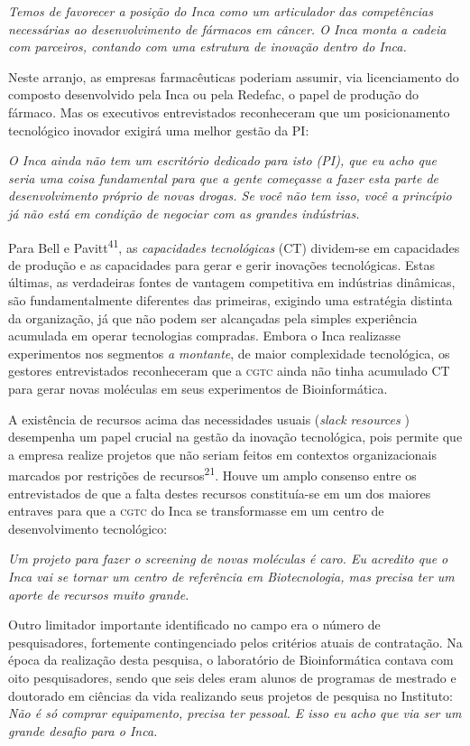 \documentclass{article}
\begin{document}
\textit{Temos de favorecer a posição do Inca como um articulador das
competências necessárias ao desenvolvimento de fármacos em câncer. O Inca monta
a cadeia com parceiros, contando com uma estrutura de inovação dentro do Inca.}

Neste arranjo, as empresas farmacêuticas poderiam assumir, via licenciamento do
composto desenvolvido pela Inca ou pela Redefac, o papel de produção do
fármaco\textit{.}
Mas os executivos entrevistados reconheceram que um posicionamento tecnológico
inovador exigirá uma melhor gestão da PI:

\textit{O Inca ainda não tem um escritório dedicado para isto (PI), que eu acho
que seria uma coisa fundamental para que a gente começasse a fazer esta parte de
desenvolvimento próprio de novas drogas. Se você não tem isso, você a princípio
já não está em condição de negociar com as grandes indústrias.}

Para Bell e Pavitt\textsuperscript{41}, as \textit{capacidades tecnológicas}
(CT) dividem-se em capacidades de produção e as capacidades para gerar e gerir
inovações tecnológicas. Estas últimas, as verdadeiras fontes de vantagem
competitiva em indústrias dinâmicas, são fundamentalmente diferentes das
primeiras, exigindo uma estratégia distinta da organização, já que não podem ser
alcançadas pela simples experiência acumulada em operar tecnologias compradas.
Embora o Inca realizasse experimentos nos segmentos \textit{a montante}, de maior complexidade tecnológica, os gestores entrevistados reconheceram que
a \textsc{cgtc} ainda não tinha acumulado CT para gerar novas moléculas em seus
experimentos de Bioinformática.

A existência de recursos acima das necessidades usuais (\textit{slack resources}
) desempenha um papel crucial na gestão da inovação tecnológica, pois permite
que a empresa realize projetos que não seriam feitos em contextos
organizacionais marcados por restrições de recursos\textsuperscript{21}. Houve um amplo consenso entre os entrevistados de que a falta destes recursos
constituía-se em um dos maiores entraves para que a \textsc{cgtc} do Inca se
transformasse em um centro de desenvolvimento tecnológico:

\textit{Um projeto para fazer o screening de novas moléculas é caro. Eu acredito
que o Inca vai se tornar um centro de referência em Biotecnologia, mas precisa
ter um aporte de recursos muito grande.}

Outro limitador importante identificado no campo era o número de pesquisadores,
fortemente contingenciado pelos critérios atuais de contratação. Na época da
realização desta pesquisa, o laboratório de Bioinformática contava com oito
pesquisadores, sendo que seis deles eram alunos de programas de mestrado e
doutorado em ciências da vida realizando seus projetos de pesquisa no Instituto:
\textit{Não é só comprar equipamento, precisa ter pessoal. E isso eu acho que
via ser um grande desafio para o Inca.}
\end{document}
